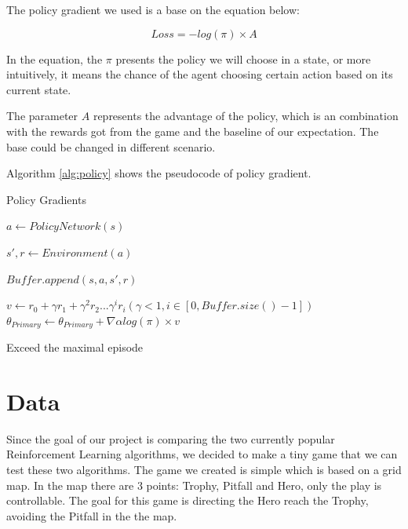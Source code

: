 \documentclass[article]{aaltoseries}
\begin{document}
 

The policy gradient we used is a base on the equation below:

\begin{equation} \label{eq:q_loss}
  Loss = -log(\pi) \times A
\end{equation}

In the equation, the $\pi$ presents the policy we will choose in a state, 
or more intuitively, it means the chance of the agent choosing certain action 
based on its current state.

The parameter $A$ represents the advantage of the policy, 
which is an combination with the rewards got from the game 
and the baseline of our expectation. The base could be changed in different scenario.

Algorithm \ref{alg:policy} shows the pseudocode of policy gradient. 



\begin{algorithm}
  \caption{Policy Gradients}
  \label{alg:policy}
  \begin{algorithmic}[1]
    \Repeat

      
      \State $a \gets PolicyNetwork(s)$  

      \State $s\prime ,r \gets Environment(a)$

      \State $Buffer.append(s, a, s\prime, r)$ 

        \State $v \gets r_0+ \gamma r_1 + \gamma^2 r_2 ... \gamma^i r_i (\gamma < 1, i \in [0,Buffer.size()-1]) $
        \State $\theta_{Primary} \gets \theta_{Primary} + \nabla \alpha log(\pi) \times v$
      \EndIf
      \EndFor

    \Until Exceed the maximal episode
  \end{algorithmic}
\end{algorithm}




\section{Data}

Since the goal of our project is comparing the two currently popular Reinforcement 
Learning algorithms, we decided to make a tiny game that we can test these two algorithms.
 The game we created is simple which is based on a grid map. 
 In the map there are 3 points: Trophy, Pitfall and Hero, only the play is controllable. 
 The goal for this game is directing the Hero reach the Trophy, avoiding the Pitfall 
 in the the map. 
 
\end{document}
